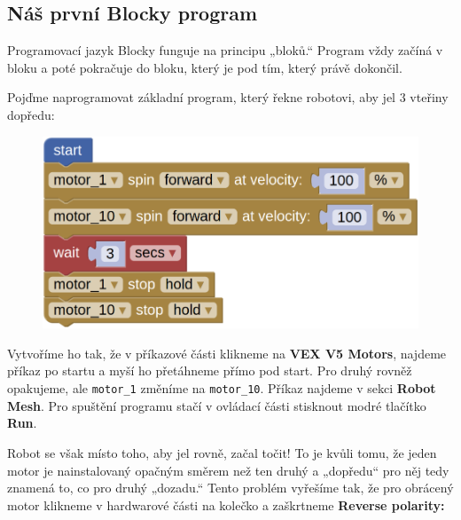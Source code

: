 \documentclass[../main.tex]{subfiles}
\begin{document}
	\subsection{Náš první Blocky program}

	Programovací jazyk Blocky funguje na principu „bloků.“ Program vždy začíná v bloku \blockStartImage a poté pokračuje do bloku, který je pod tím, který právě dokončil.

	Pojďme naprogramovat základní program, který řekne robotovi, aby jel $3$ vteřiny dopředu:

	\begin{figure}[h!]
		\centering
		\begin{minipage}{0.5\textwidth}
			\includegraphics[width=\linewidth]{../Images/01/program-1.png}
		\end{minipage}
	\end{figure}

	Vytvoříme ho tak, že v příkazové části klikneme na \textbf{VEX V5 Motors}, najdeme příkaz po startu a myší ho přetáhneme přímo pod start. Pro druhý rovněž opakujeme, ale \texttt{motor\_1} změníme na \texttt{motor\_10}. Příkaz \blockWaitImage najdeme v sekci \textbf{Robot Mesh}. Pro spuštění programu stačí v ovládací části stisknout modré tlačítko \textbf{Run}.

	Robot se však místo toho, aby jel rovně, začal točit! To je kvůli tomu, že jeden motor je nainstalovaný opačným směrem než ten druhý a „dopředu“ pro něj tedy znamená to, co pro druhý „dozadu.“ Tento problém vyřešíme tak, že pro obrácený motor klikneme v hardwarové části na kolečko a zaškrtneme \textbf{Reverse polarity:}
\end{document}
